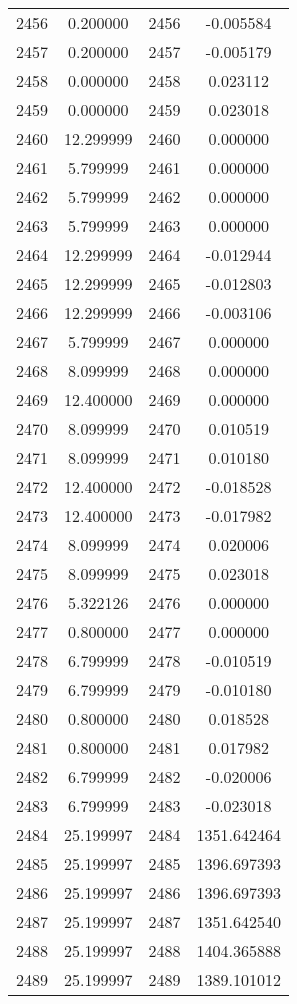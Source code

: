 \documentclass[12pt]{article}
\begin{document}
\begin{longtable}{@{}cccc@{}}
2456 & 0.200000 & 2456 & -0.005584 \\
2457 & 0.200000 & 2457 & -0.005179 \\
2458 & 0.000000 & 2458 & 0.023112 \\
2459 & 0.000000 & 2459 & 0.023018 \\
2460 & 12.299999 & 2460 & 0.000000 \\
2461 & 5.799999 & 2461 & 0.000000 \\
2462 & 5.799999 & 2462 & 0.000000 \\
2463 & 5.799999 & 2463 & 0.000000 \\
2464 & 12.299999 & 2464 & -0.012944 \\
2465 & 12.299999 & 2465 & -0.012803 \\
2466 & 12.299999 & 2466 & -0.003106 \\
2467 & 5.799999 & 2467 & 0.000000 \\
2468 & 8.099999 & 2468 & 0.000000 \\
2469 & 12.400000 & 2469 & 0.000000 \\
2470 & 8.099999 & 2470 & 0.010519 \\
2471 & 8.099999 & 2471 & 0.010180 \\
2472 & 12.400000 & 2472 & -0.018528 \\
2473 & 12.400000 & 2473 & -0.017982 \\
2474 & 8.099999 & 2474 & 0.020006 \\
2475 & 8.099999 & 2475 & 0.023018 \\
2476 & 5.322126 & 2476 & 0.000000 \\
2477 & 0.800000 & 2477 & 0.000000 \\
2478 & 6.799999 & 2478 & -0.010519 \\
2479 & 6.799999 & 2479 & -0.010180 \\
2480 & 0.800000 & 2480 & 0.018528 \\
2481 & 0.800000 & 2481 & 0.017982 \\
2482 & 6.799999 & 2482 & -0.020006 \\
2483 & 6.799999 & 2483 & -0.023018 \\
2484 & 25.199997 & 2484 & 1351.642464 \\
2485 & 25.199997 & 2485 & 1396.697393 \\
2486 & 25.199997 & 2486 & 1396.697393 \\
2487 & 25.199997 & 2487 & 1351.642540 \\
2488 & 25.199997 & 2488 & 1404.365888 \\
2489 & 25.199997 & 2489 & 1389.101012 \\

\end{longtable}
\end{document}
